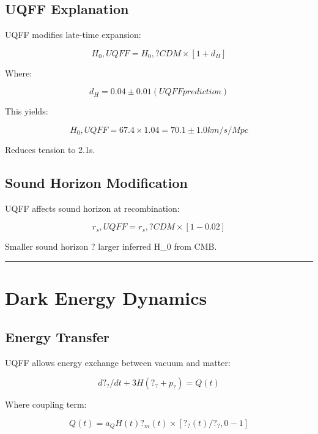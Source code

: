 \documentclass[12pt,a4paper]{article}
\begin{document}
\subsection{UQFF Explanation}

UQFF modifies late-time expansion:

\begin{equation}
H_0,UQFF = H_0,?CDM \times [1 + d_H]
\end{equation}

Where:

\begin{equation}
d_H = 0.04 \pm 0.01 (UQFF prediction)
\end{equation}

This yields:

\begin{equation}
H_0,UQFF = 67.4 \times 1.04 = 70.1 \pm 1.0 km/s/Mpc
\end{equation}

Reduces tension to 2.1s.

\subsection{Sound Horizon Modification}

UQFF affects sound horizon at recombination:

\begin{equation}
r_s,UQFF = r_s,?CDM \times [1 - 0.02]
\end{equation}

Smaller sound horizon ? larger inferred H\_0 from CMB.

\medskip\hrule\medskip

\section{Dark Energy Dynamics}

\subsection{Energy Transfer}

UQFF allows energy exchange between vacuum and matter:

\begin{equation}
d?_?/dt + 3H(?_? + p_?) = Q(t)
\end{equation}

Where coupling term:

\begin{equation}
Q(t) = a_Q H(t) ?_m(t) \times [?_?(t)/?_?,0 - 1]
\end{equation}
\end{document}
